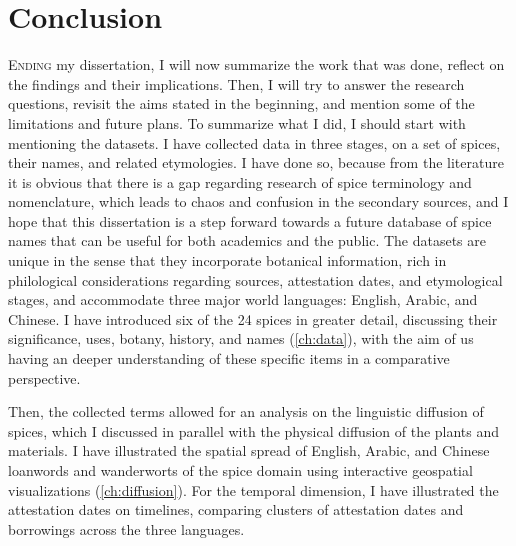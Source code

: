 \chapter{Conclusion}
\label{ch:conclusion}


\lettrine[lines=\iniciale]{\textcolor{\accentcolor}{E}}{nding} my dissertation, I will now summarize the work that was done, reflect on the findings and their implications. Then, I will try to answer the research questions, revisit the aims stated in the beginning, and mention some of the limitations and future plans. To summarize what I did, I should start with mentioning the datasets. I have collected data in three stages, on a set of spices, their names, and related etymologies. I have done so, because from the literature it is obvious that there is a gap regarding research of spice terminology and nomenclature, which leads to chaos and confusion in the secondary sources, and I hope that this dissertation is a step forward towards a future database of spice names that can be useful for both academics and the public. The datasets are unique in the sense that they incorporate botanical information, rich in philological considerations regarding sources, attestation dates, and etymological stages, and accommodate three major world languages: English, Arabic, and Chinese. I have introduced six of the 24 spices in greater detail, discussing their significance, uses, botany, history, and names (\cref{ch:data}), with the aim of us having an deeper understanding of these specific items in a comparative perspective. 

Then, the collected terms allowed for an analysis on the linguistic diffusion of spices, which I discussed in parallel with the physical diffusion of the plants and materials. I have illustrated the spatial spread of English, Arabic, and Chinese loanwords and \glspl{wanderwort} of the spice domain using interactive geospatial visualizations (\cref{ch:diffusion}). For the temporal dimension, I have illustrated the attestation dates on timelines, comparing clusters of attestation dates and borrowings across the three languages. 

